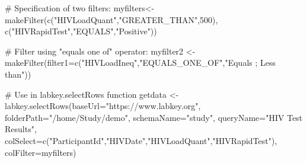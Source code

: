 \documentclass{article}
\begin{document}
\begin{Examples}
\begin{ExampleCode}

# Specification of two filters:
myfilters<- makeFilter(c("HIVLoadQuant","GREATER_THAN",500), c("HIVRapidTest","EQUALS","Positive"))

# Filter using "equals one of" operator:
myfilter2 <- makeFilter(filter1=c("HIVLoadIneq","EQUALS_ONE_OF","Equals ; Less than"))

# Use in labkey.selectRows function
getdata <- labkey.selectRows(baseUrl="https://www.labkey.org", folderPath="/home/Study/demo", schemaName="study", queryName="HIV Test Results", colSelect=c("ParticipantId","HIVDate","HIVLoadQuant","HIVRapidTest"), colFilter=myfilters)


\end{ExampleCode}
\end{Examples}
\end{document}

